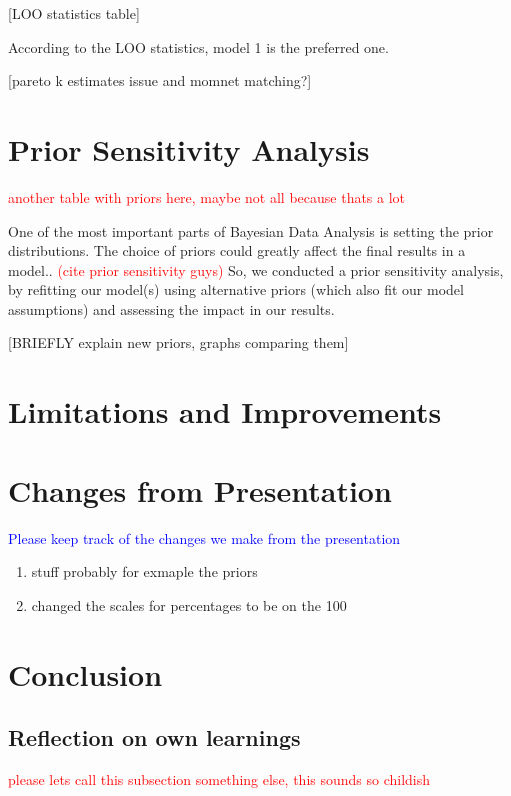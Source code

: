 \documentclass[12pt]{article}
\newcommand{\blue}[1]{\textcolor{blue}{#1}}
\begin{document}
[LOO statistics table]

According to the LOO statistics, model 1 is the preferred one.

[pareto k estimates issue and momnet matching?]


\section{Prior Sensitivity Analysis}

\textcolor{red}{another table with priors here, maybe not all because thats a lot}

One of the most important parts of Bayesian Data Analysis is setting the prior distributions. The choice of priors could greatly affect the final results in a model..  \textcolor{red}{(cite prior sensitivity guys)}
So, we conducted a prior sensitivity analysis, by refitting our model(s) using alternative priors (which also fit our model assumptions) and assessing the impact in our results.

[BRIEFLY explain new priors, graphs comparing them]



\section{Limitations and Improvements}


\section{Changes from Presentation}
\blue{Please keep track of the changes we make from the presentation}
\begin{enumerate}
	\item stuff probably for exmaple the priors 
	\item changed the scales for percentages to be on the 100 
\end{enumerate}

\section{Conclusion}

\subsection{Reflection on own learnings}

\textcolor{red}{please lets call this subsection something else, this sounds so childish}


\printbibliography
\end{document}
